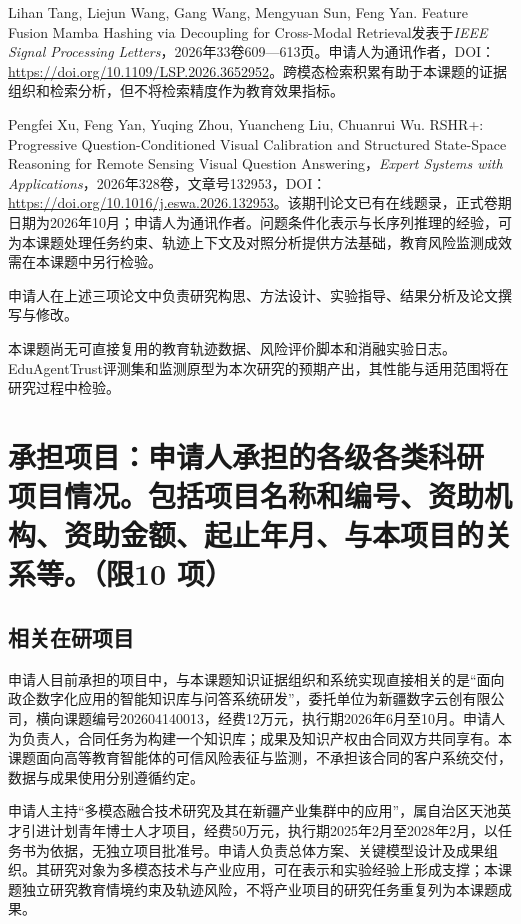 Lihan Tang, Liejun Wang, Gang Wang, Mengyuan Sun, Feng Yan. Feature Fusion Mamba Hashing via Decoupling for Cross-Modal Retrieval发表于\textit{IEEE Signal Processing Letters}，2026年33卷609—613页\cite{tang2026hashing}。申请人为通讯作者，DOI：\url{https://doi.org/10.1109/LSP.2026.3652952}。跨模态检索积累有助于本课题的证据组织和检索分析，但不将检索精度作为教育效果指标。

Pengfei Xu, Feng Yan, Yuqing Zhou, Yuancheng Liu, Chuanrui Wu. RSHR+: Progressive Question-Conditioned Visual Calibration and Structured State-Space Reasoning for Remote Sensing Visual Question Answering，\textit{Expert Systems with Applications}，2026年328卷，文章号132953，DOI：\url{https://doi.org/10.1016/j.eswa.2026.132953}。该期刊论文已有在线题录，正式卷期日期为2026年10月；申请人为通讯作者。问题条件化表示与长序列推理的经验，可为本课题处理任务约束、轨迹上下文及对照分析提供方法基础，教育风险监测成效需在本课题中另行检验。

申请人在上述三项论文中负责研究构思、方法设计、实验指导、结果分析及论文撰写与修改。

本课题尚无可直接复用的教育轨迹数据、风险评价脚本和消融实验日志。EduAgentTrust评测集和监测原型为本次研究的预期产出，其性能与适用范围将在研究过程中检验。

\section{\textbf{承担项目}：申请人承担的各级各类科研项目情况。包括项目名称和编号、资助机构、资助金额、起止年月、与本项目的关系等。\textbf{（限10 项）}}

\subsection{相关在研项目}
申请人目前承担的项目中，与本课题知识证据组织和系统实现直接相关的是“面向政企数字化应用的智能知识库与问答系统研发”，委托单位为新疆数字云创有限公司，横向课题编号202604140013，经费12万元，执行期2026年6月至10月。申请人为负责人，合同任务为构建一个知识库；成果及知识产权由合同双方共同享有。本课题面向高等教育智能体的可信风险表征与监测，不承担该合同的客户系统交付，数据与成果使用分别遵循约定。

申请人主持“多模态融合技术研究及其在新疆产业集群中的应用”，属自治区天池英才引进计划青年博士人才项目，经费50万元，执行期2025年2月至2028年2月，以任务书为依据，无独立项目批准号。申请人负责总体方案、关键模型设计及成果组织。其研究对象为多模态技术与产业应用，可在表示和实验经验上形成支撑；本课题独立研究教育情境约束及轨迹风险，不将产业项目的研究任务重复列为本课题成果。

